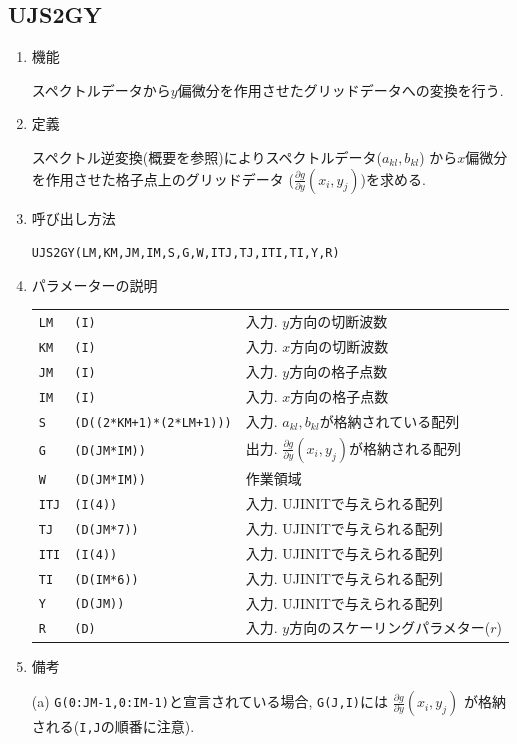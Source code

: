 \documentclass[a4j,fleqn]{jarticle}
\begin{document}
\subsection{UJS2GY}

\begin{enumerate}

\item 機能 

スペクトルデータから$y$偏微分を作用させたグリッドデータへの変換を行う.

\item 定義

スペクトル逆変換(概要を参照)によりスペクトルデータ($a_{kl},b_{kl}$)
から$x$偏微分を作用させた格子点上のグリッドデータ
($\frac{\partial g}{\partial y}(x_i,y_j)$)を求める.

\item 呼び出し方法 

{\tt UJS2GY(LM,KM,JM,IM,S,G,W,ITJ,TJ,ITI,TI,Y,R)}
  
\item パラメーターの説明

\begin{tabular}{lll}
{\tt LM} & {\tt (I)} & 入力. $y$方向の切断波数\\
{\tt KM} & {\tt (I)} & 入力. $x$方向の切断波数\\
{\tt JM} & {\tt (I)} & 入力. $y$方向の格子点数\\
{\tt IM} & {\tt (I)} & 入力. $x$方向の格子点数\\
{\tt S} & {\tt (D((2*KM+1)*(2*LM+1)))} & 入力. $a_{kl},b_{kl}$が格納されている配列\\
{\tt G} & {\tt (D(JM*IM))} & 出力. $\frac{\partial g}{\partial y}(x_i,y_j)$が格納される配列\\
{\tt W} & {\tt (D(JM*IM))} & 作業領域\\
{\tt ITJ} & {\tt (I(4))} & 入力. UJINITで与えられる配列\\
{\tt TJ} & {\tt (D(JM*7))} & 入力. UJINITで与えられる配列\\
{\tt ITI} & {\tt (I(4))} & 入力. UJINITで与えられる配列\\
{\tt TI} & {\tt (D(IM*6))} & 入力. UJINITで与えられる配列\\
{\tt Y} & {\tt (D(JM))} & 入力. UJINITで与えられる配列\\
{\tt R} & {\tt (D)} & 入力. $y$方向のスケーリングパラメター($r$)\\
\end{tabular}

\item 備考

(a) {\tt G(0:JM-1,0:IM-1)}と宣言されている場合, {\tt G(J,I)}には
    $\frac{\partial g}{\partial y}(x_i,y_j)$
    が格納される({\tt I,J}の順番に注意).

\end{enumerate}
\end{document}
